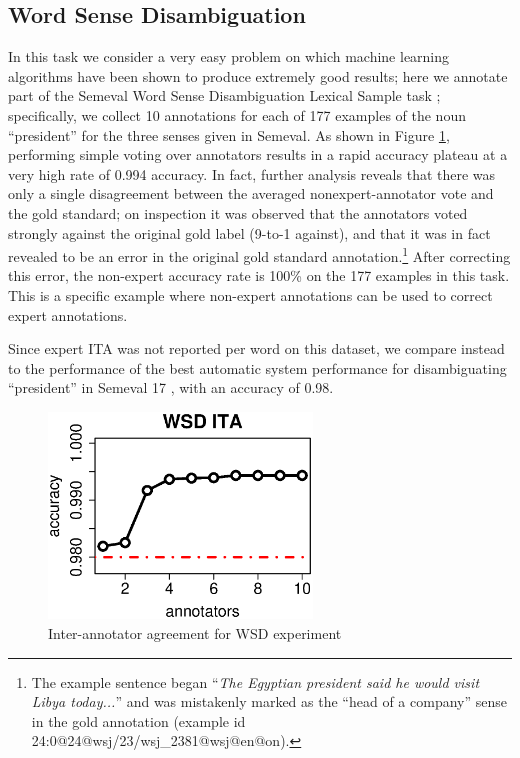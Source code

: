 \documentclass[11pt]{article}
\begin{document}
\subsection{ Word Sense Disambiguation }

In this task we consider a very easy problem on which machine learning algorithms have been shown to produce extremely good results; here we annotate part of the Semeval Word Sense Disambiguation Lexical Sample task \cite{task17}; specifically, we collect 10 annotations for each of 177 examples of the noun ``president'' for the three senses given in Semeval.  As shown in Figure \ref{wsdITA}, performing simple voting over annotators results in a rapid accuracy plateau at a very high rate of 0.994 accuracy.  In fact, further analysis reveals that there was only a single disagreement between the averaged nonexpert-annotator vote and the gold standard; on inspection it was observed that the annotators voted strongly against the original gold label (9-to-1 against), and that it was in fact revealed to be an error in the original gold standard
annotation.\footnote{The example sentence began ``\textit{The Egyptian president said he would visit Libya today...}'' and was mistakenly marked as the ``head of a company'' sense in the gold annotation (example id 24:0@24@wsj/23/wsj\_2381@wsj@en@on).}  
After correcting this error, the non-expert accuracy rate is 100\% on the 177 examples in this task.  This is a specific example where non-expert annotations can be used to correct expert annotations.

Since expert ITA was not reported per word on this dataset, we compare instead to the performance of the best automatic system performance for disambiguating ``president'' in Semeval 17 \cite{Cai:07}, with an accuracy of 0.98.  %

\begin{figure}[ht]
\centering
\includegraphics[width=7cm]{figures/wsd.eps}
\caption{Inter-annotator agreement for WSD experiment } \label{wsdITA}
\end{figure}
\end{document}
